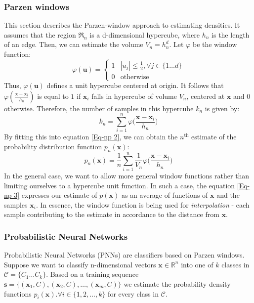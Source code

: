 	\subsubsection{Parzen windows}
	This section describes the Parzen-window approach to estimating densities. It assumes that the region $\mathfrak{R}_n$ is a d-dimensional hypercube, where $h_n$ is the length of an edge. Then, we can estimate the volume $V_n = h_n^d$. Let $\varphi$ be the window function:
	\begin{equation}
		\varphi(\mathbf{u}) = \begin{cases}
											 1 & |u_j| \leq \frac{1}{2}, \forall j \in \{1\dots d\} \\
											 0 & \text{otherwise}
									   	\end{cases}
	\end{equation}
	Thus, $\varphi(\mathbf{u})$ defines a unit hypercube centered at origin. It follows that $\varphi(\frac{\mathbf{x} - \mathbf{x}_i}{h_n})$ is equal to $1$ if $\mathbf{x}_i$ falls in hypercube of volume $V_n$, centered at $\mathbf{x}$ and $0$ otherwise. Therefore, the number of samples in this hypercube $k_n$ is given by:
	\begin{equation}
		k_n = \sum_{i=1}^{n} \varphi \bigg(\frac{\mathbf{x} - \mathbf{x}_i}{h_n}\bigg)
	\end{equation}
	By fitting this into equation \ref{Eq-np 2}, we can obtain the $n^{\text{th}}$ estimate of the probability distribution function $p_n(\mathbf{x})$: 
	\begin{equation}
		p_n(\mathbf{x}) = \frac{1}{n} \sum_{i=1}^{n} \frac{1}{V_n} \varphi \bigg( \frac{\mathbf{x} - \mathbf{x}_i}{h_n} \bigg)
		\label{Eq-np 3}
 	\end{equation} 
 	In the general case, we want to allow more general window functions rather than limiting ourselves to a hypercube unit function. In such a case, the equation \ref{Eq-np 3} expresses our estimate of $p(\mathbf{x})$ as an average of functions of $\mathbf{x}$ and the samples $\mathbf{x}_i$. In essence, the window function is being used for \textit{interpolation} - each sample contributing to the estimate in accordance to the distance from $\mathbf{x}$.
 	
 	\subsubsection{Probabilistic Neural Networks}
 	Probabilistic Neural Networks (PNNs) are classifiers based on Parzen windows. Suppose we want to classify n-dimensional vectors $\mathbf{x} \in \mathbb{R}^n$ into one of $k$ classes in $\mathcal{C}=\{C_1\dots C_k\}$. Based on a training sequence $\mathbf{s} = \{ (\mathbf{x}_1, C), (\mathbf{x}_2, C), \dots ,(\mathbf{x}_m, C)\}$ we estimate the probability density functions $p_i(\mathbf{x}). \forall i \in \{1,2,\dots,k \}$ for every class in $\mathcal{C}$. 

